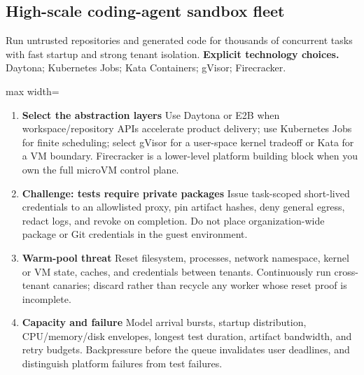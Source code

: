 \subsection{High-scale coding-agent sandbox fleet}
Run untrusted repositories and generated code for thousands of concurrent tasks with fast startup and strong tenant isolation.
\textbf{Explicit technology choices.} Daytona; Kubernetes Jobs; Kata Containers; gVisor; Firecracker.
\begin{center}\begin{adjustbox}{max width=\linewidth}\end{adjustbox}\end{center}
\begin{enumerate}
\item \textbf{Select the abstraction layers} Use Daytona or E2B when workspace/repository APIs accelerate product delivery; use Kubernetes Jobs for finite scheduling; select gVisor for a user-space kernel tradeoff or Kata for a VM boundary. Firecracker is a lower-level platform building block when you own the full microVM control plane.
\item \textbf{Challenge: tests require private packages} Issue task-scoped short-lived credentials to an allowlisted proxy, pin artifact hashes, deny general egress, redact logs, and revoke on completion. Do not place organization-wide package or Git credentials in the guest environment.
\item \textbf{Warm-pool threat} Reset filesystem, processes, network namespace, kernel or VM state, caches, and credentials between tenants. Continuously run cross-tenant canaries; discard rather than recycle any worker whose reset proof is incomplete.
\item \textbf{Capacity and failure} Model arrival bursts, startup distribution, CPU/memory/disk envelopes, longest test duration, artifact bandwidth, and retry budgets. Backpressure before the queue invalidates user deadlines, and distinguish platform failures from test failures.
\end{enumerate}
